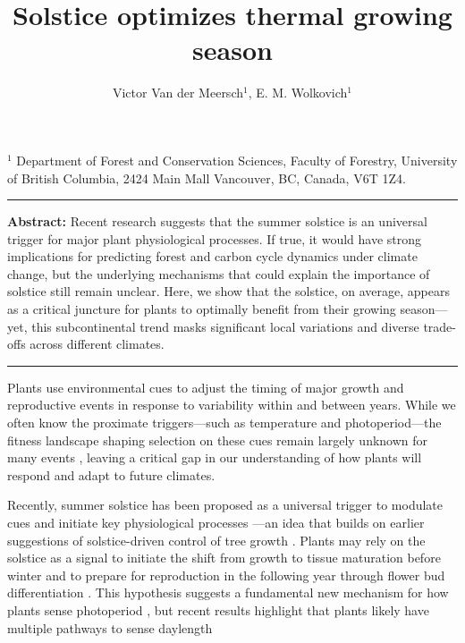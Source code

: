 \documentclass[11pt,letter]{article}
\begin{document}
\title{Solstice optimizes thermal growing season}

\author{Victor Van der Meersch$^{1}$, E. M. Wolkovich$^{1}$}
\date{}
\maketitle 

$^1$ Department of Forest and Conservation Sciences, Faculty of Forestry, University of British Columbia, 2424 Main Mall
Vancouver, BC, Canada, V6T 1Z4. \\

\noindent\rule{\textwidth}{0.3pt}
\textbf{Abstract:} Recent research suggests that the summer solstice is an universal trigger for major plant physiological processes. If true, it would have strong implications for predicting forest and carbon cycle dynamics under climate change, but the underlying mechanisms that could explain the importance of solstice still remain unclear. Here, we show that the solstice, on average, appears as a critical juncture for plants to optimally benefit from their growing season---yet, this subcontinental trend masks significant local variations and diverse trade-offs across different climates.\\
\noindent\rule{\textwidth}{0.3pt}

\vspace{0.5cm}

Plants use environmental cues to adjust the timing of major growth and reproductive events in response to variability within and between years. While we often know the proximate triggers---such as temperature and photoperiod---the fitness landscape shaping selection on these cues remain largely unknown for many events \citep{Chuine2017}, leaving a critical gap in our understanding of how plants will respond and adapt to future climates.

Recently, summer solstice has been proposed as a universal trigger to modulate cues and initiate key physiological processes \citep{Zohner2023, Journe2024}---an idea that builds on earlier suggestions of solstice-driven control of tree growth \citep{Rossi2006}. 
Plants may rely on the solstice as a signal to initiate the shift from growth to tissue maturation before winter and to prepare for reproduction in the following year through flower bud differentiation \citep{Rossi2006, Zohner2023, Journe2024}. This hypothesis suggests a fundamental new mechanism for how plants sense photoperiod \citep{Gendron2023}, but recent results highlight that plants likely have multiple pathways to sense daylength  \citep{wang2024plants} 
\end{document}

